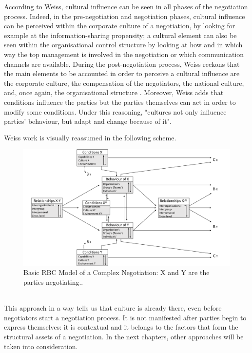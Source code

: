 \documentclass[../main.tex]{subfiles}
\begin{document}
According to Weiss, cultural influence can be seen in all phases of the negotiation process. Indeed, in the pre-negotiation and negotiation phases, cultural influence can be perceived within the corporate culture of a negotiation, by looking for example at the information-sharing propensity; a cultural element can also be seen within the organisational control structure by looking at how and in which way the top management is involved in the negotiation or which communication channels are available. During the post-negotiation process, Weiss reckons that the main elements to be accounted in order to perceive a cultural influence are the corporate culture, the compensation of the negotiators, the national culture, and, once again, the organisational structure \autocite[285]{weiss}.
Moreover, Weiss adds that conditions influence the parties but the parties themselves can act in order to modify some conditions. Under this reasoning, "cultures not only influence parties' behaviour, but adapt and change because of it"\autocite[289]{weiss}.

Weiss work is visually reassumed in the following scheme.

\begin{figure}[h]
    \centering\includegraphics[width=\textwidth]{images/rbc.pdf}
    \caption{Basic RBC Model of a Complex Negotiation: X and Y are the parties negotiating.\autocite[276]{weiss}.}
\end{figure}\\

This approach in a way tells us that culture is already there, even before negotiators start a negotiation process. It is not manifested after parties begin to express themselves: it is contextual and it belongs to the factors that form the structural assets of a negotiation. In the next chapters, other approaches will be taken into consideration.
\end{document}
